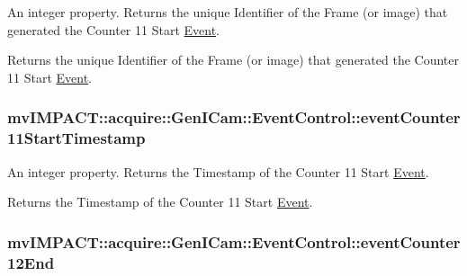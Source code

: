 An integer property. Returns the unique Identifier of the Frame (or image) that generated the Counter 11 Start \hyperlink{classmv_i_m_p_a_c_t_1_1acquire_1_1_event}{Event}. 

Returns the unique Identifier of the Frame (or image) that generated the Counter 11 Start \hyperlink{classmv_i_m_p_a_c_t_1_1acquire_1_1_event}{Event}. \hypertarget{classmv_i_m_p_a_c_t_1_1acquire_1_1_gen_i_cam_1_1_event_control_ab5f60d9281a4aa8e94d808ed6192b530}{
\subsubsection[{event\+Counter11\+Start\+Timestamp}]{ mv\+I\+M\+P\+A\+C\+T\+::acquire\+::\+Gen\+I\+Cam\+::\+Event\+Control\+::event\+Counter11\+Start\+Timestamp}}\label{classmv_i_m_p_a_c_t_1_1acquire_1_1_gen_i_cam_1_1_event_control_ab5f60d9281a4aa8e94d808ed6192b530}


An integer property. Returns the Timestamp of the Counter 11 Start \hyperlink{classmv_i_m_p_a_c_t_1_1acquire_1_1_event}{Event}. 

Returns the Timestamp of the Counter 11 Start \hyperlink{classmv_i_m_p_a_c_t_1_1acquire_1_1_event}{Event}. \hypertarget{classmv_i_m_p_a_c_t_1_1acquire_1_1_gen_i_cam_1_1_event_control_a4dcbb2cec3b11f195dcda2822271ad49}{
\subsubsection[{event\+Counter12\+End}]{ mv\+I\+M\+P\+A\+C\+T\+::acquire\+::\+Gen\+I\+Cam\+::\+Event\+Control\+::event\+Counter12\+End}}\label{classmv_i_m_p_a_c_t_1_1acquire_1_1_gen_i_cam_1_1_event_control_a4dcbb2cec3b11f195dcda2822271ad49}


